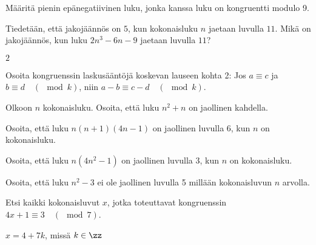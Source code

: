 \begin{kotitehtavasivu}
\begin{tehtava}
	Määritä pienin epänegatiivinen luku, jonka kanssa luku
	on kongruentti modulo 9.
	
	\begin{vastaus}
	\end{vastaus}
\end{tehtava}

\begin{tehtava}
	Tiedetään, että jakojäännös on $5$, kun kokonaisluku $n$ jaetaan luvulla $11$. Mikä on jakojäännös, kun luku $2n^3 - 6n - 9$ jaetaan luvulla $11$?
	
	\begin{vastaus}
	$2$
	\end{vastaus}
\end{tehtava}

\begin{tehtava}
	Osoita kongruenssin laskusääntöjä koskevan lauseen kohta 2: Jos $a\equiv c$ ja $b\equiv d\quad (\mod k)$, niin $a-b\equiv c-d \quad(\mod k)$.
\end{tehtava}

\begin{tehtava}
	Olkoon $n$ kokonaisluku. Osoita, että luku $n^2 + n$ on jaollinen kahdella.
\end{tehtava}

\begin{tehtava}
	Osoita, että luku $n(n + 1)(4n - 1)$ on jaollinen luvulla 6, kun $n$ on kokonaisluku.
\end{tehtava}

\begin{tehtava}
	Osoita, että luku $n(4n^2 - 1)$ on jaollinen luvulla 3, kun $n$ on kokonaisluku.
\end{tehtava}

\begin{tehtava}
	Osoita, että luku $n^2 - 3$ ei ole jaollinen luvulla 5 millään kokonaisluvun $n$ arvolla.
\end{tehtava}

\begin{tehtava}
	Etsi kaikki kokonaisluvut $x$, jotka toteuttavat kongruenssin $4x+1\equiv 3\quad (\mod 7)$.
	
	\begin{vastaus}
		$x = 4 + 7 k$, missä $k\in\zz$
	\end{vastaus}
\end{tehtava}


\end{kotitehtavasivu}
